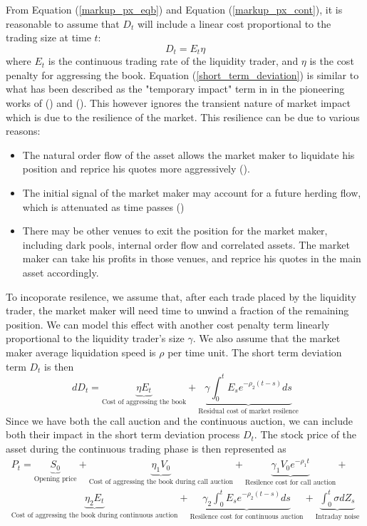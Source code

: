 \documentclass{article}
\begin{document}
From Equation (\ref{markup_px_eqb}) and Equation (\ref{markup_px_cont}), it is reasonable to assume that $D_t$ will include a linear cost proportional to the trading size at time $t$:
\begin{equation}\label{short_term_deviation}
  D_t = E_t \eta
\end{equation}
where $E_t$ is the continuous trading rate of the liquidity trader, and $\eta$ is the cost penalty for aggressing the book. Equation (\ref{short_term_deviation}) is similar to what has been described as the "temporary impact" term in in the pioneering works of (\cite{BertimasLo1999}) and (\cite{AlmgrenChriss2000}). This however ignores the transient nature of market impact which is due to the resilience of the market. This resilience can be due to various reasons:
\begin{itemize}
  \item The natural order flow of the asset allows the market maker to liquidate his position and reprice his quotes more aggressively (\cite{Avellaneda2008}).
  \item The initial signal of the market maker may account for a future herding flow, which is attenuated as time passes (\cite{Thibault2015})
  \item There may be other venues to exit the position for the market maker, including dark pools, internal order flow and correlated assets. The market maker can take his profits in those venues, and reprice his quotes in the main asset accordingly.
\end{itemize}
To incoporate resilence, we assume that, after each trade placed by the liquidity trader, the market maker will need time to unwind a fraction of the remaining position. We can model this effect with another cost penalty term linearly proportional to the liquidity trader's size $\gamma$. We also assume that the market maker average liquidation speed is $\rho$ per time unit. The short term deviation term $D_t$ is then
\[
  dD_t = \underbrace{\eta E_t}_\text{Cost of aggressing the book} + \underbrace{\gamma \int_0^t E_s e^{-\rho_2 (t-s)} ds}_\text{Residual cost of market resilence}
\]
Since we have both the call auction and the continuous auction, we can include both their impact in the short term deviation process $D_t$. The stock price of the asset during the continuous trading phase is then represented as
\begin{equation}\label{resilence_eqn}
  \begin{split}
    P_t = \underbrace{S_0}_{\text{Opening price}} + \underbrace{\eta_1 V_0}_\text{Cost of aggressing the book during call auction}
    + \underbrace{\gamma_1 V_0 e^{-\rho_1 t}}_{\text{Resilence cost for call auction}}+ \\
    \underbrace{\eta_2 E_t}_\text{Cost of aggressing the book during continuous auction} + \underbrace{\gamma_2 \int_0^t E_s e^{-\rho_2 (t-s)} ds}_{\text{Resilence cost for continuous auction}} +  \underbrace{\int_0^t \sigma dZ_s}_{\text{Intraday noise}}
  \end{split}
\end{equation}
\end{document}
